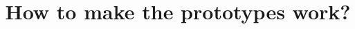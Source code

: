 \documentclass[10pt]{article}
\begin{document}
\title{\vspace{-3.5cm} How to make the prototypes work?}
\end{document}
